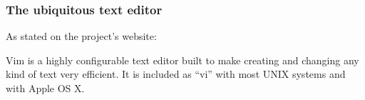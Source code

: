 \begin{frame}[fragile]
  \frametitle{The ubiquitous text editor}
  As stated on the project's website:

  \vspace{1cm}

  Vim is a highly configurable text editor built to make creating and changing
  any kind of text very efficient. It is included as ``vi'' with most UNIX
  systems and with Apple OS X.
\end{frame}
